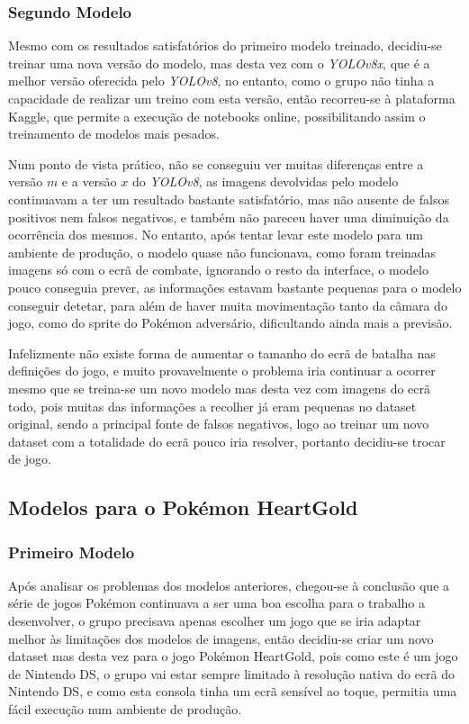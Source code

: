 \subsubsection{Segundo Modelo}
Mesmo com os resultados satisfatórios do primeiro modelo treinado, decidiu-se treinar uma nova versão do modelo, mas desta vez com o \textit{YOLOv8x}, que é a melhor versão oferecida pelo \textit{YOLOv8}, no entanto, como o grupo não tinha a capacidade de realizar um treino com esta versão, então recorreu-se à plataforma Kaggle, que permite a execução de notebooks online, possibilitando assim o treinamento de modelos mais pesados.

Num ponto de vista prático, não se conseguiu ver muitas diferenças entre a versão $m$ e a versão $x$ do \textit{YOLOv8}, as imagens devolvidas pelo modelo continuavam a ter um resultado bastante satisfatório, mas não ausente de falsos positivos nem falsos negativos, e também não pareceu haver uma diminuição da ocorrência dos mesmos. No entanto, após tentar levar este modelo para um ambiente de produção, o modelo quase não funcionava, como foram treinadas imagens só com o ecrã de combate, ignorando o resto da interface, o modelo pouco conseguia prever, as informações estavam bastante pequenas para o modelo conseguir detetar, para além de haver muita movimentação tanto da câmara do jogo, como do sprite do Pokémon adversário, dificultando ainda mais a previsão.

Infelizmente não existe forma de aumentar o tamanho do ecrã de batalha nas definições do jogo, e muito provavelmente o problema iria continuar a ocorrer mesmo que se treina-se um novo modelo mas desta vez com imagens do ecrã todo, pois  muitas das informações a recolher já eram pequenas no dataset original, sendo a principal fonte de falsos negativos, logo ao treinar um novo dataset com a totalidade do ecrã pouco iria resolver, portanto decidiu-se trocar de jogo.

\subsection{Modelos para o Pokémon HeartGold}
\subsubsection{Primeiro Modelo}
Após analisar os problemas dos modelos anteriores, chegou-se à conclusão que a série de jogos Pokémon continuava a ser uma boa escolha para o trabalho a desenvolver, o grupo precisava apenas escolher um jogo que se iria adaptar melhor às limitações dos modelos de imagens, então decidiu-se criar um novo dataset mas desta vez para o jogo Pokémon HeartGold, pois como este é um jogo de Nintendo DS, o grupo vai estar sempre limitado à resolução nativa do ecrã do Nintendo DS, e como esta consola tinha um ecrã sensível ao toque, permitia uma fácil execução num ambiente de produção.

